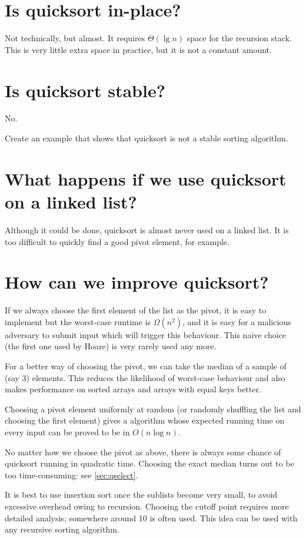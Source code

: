 \section{Is quicksort in-place?}
Not technically, but almost. It requires $\Theta(\lg n)$ space for the recursion stack. This is very little extra space in practice, but it is not a constant amount.

\section{Is quicksort stable?}
No.
\begin{Boxample}[5]
Create an example that shows that quicksort is not a stable sorting algorithm.
\end{Boxample}

\section{What happens if we  use quicksort on a linked list?}
Although it could be done, quicksort is almost never used on a linked list. It is too difficult to quickly find a good pivot element, for example.

\section{How can we improve quicksort?}
If we always choose the first element of the list as the pivot, it is easy to implement but
the worst-case runtime is $\Omega(n^2)$, and it is easy for a malicious adversary to submit input 
which will trigger this behaviour. This naive choice (the first one used by Hoare) is very rarely used any more.

For a better way of choosing the pivot, we can take the median of a sample of (say 3) elements. This reduces the 
likelihood of worst-case behaviour and also makes performance on sorted arrays 
and arrays with equal keys better. 

Choosing a pivot element uniformly at random (or randomly shuffling the list and choosing the first element) 
gives a  
algorithm whose expected running time on every input can be proved to be in 
$O(n \log n)$. 

No matter how we choose the pivot as above, there is always some chance of quicksort running in quadratic time. 
Choosing the exact median turns out to be too time-consuming: see \cref{sec:qselect}.

It is best to use insertion sort once the sublists become very small, to 
avoid excessive overhead owing to recursion. 
Choosing the cutoff point requires more detailed analysis; somewhere around 10 is often used. 
This idea can be used with any recursive sorting algorithm.


